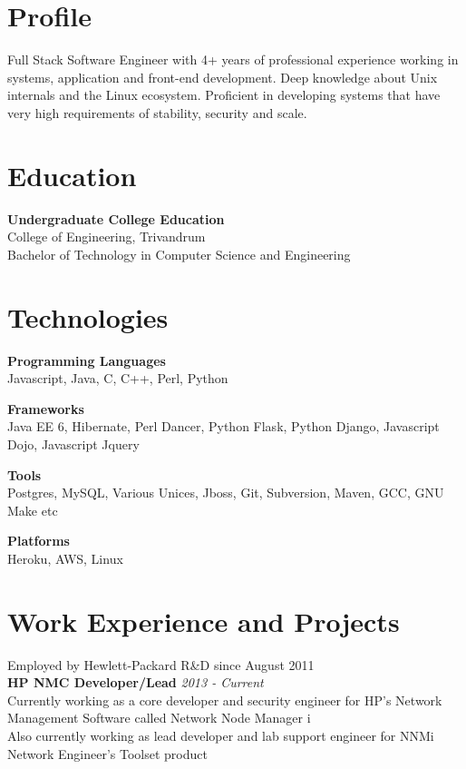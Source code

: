 \documentclass[line,margin]{res}
\begin{document}


\address{joji\_antony@gmx.com}
\address{+91 96323 41954}

\begin{resume}

\section{Profile}
Full Stack Software Engineer with 4+ years of professional experience working in systems, application and front-end development. Deep knowledge about Unix internals and the Linux ecosystem. Proficient in developing systems that have very high requirements of stability, security and scale.

\section{Education}
{\bf Undergraduate College Education}\\
College of Engineering, Trivandrum\\
Bachelor of Technology in Computer Science and Engineering\\

\section{Technologies}

{\bf Programming Languages}\\
Javascript, Java, C, C++, Perl, Python

{\bf Frameworks}\\
Java EE 6, Hibernate, Perl Dancer, Python Flask, Python Django, Javascript Dojo, Javascript Jquery

{\bf Tools}\\
Postgres, MySQL, Various Unices, Jboss, Git, Subversion, Maven, GCC, GNU Make etc

{\bf Platforms}\\
Heroku, AWS, Linux

\section{Work Experience and Projects}

Employed by Hewlett-Packard R\&D since August 2011\\

{\bf HP NMC Developer/Lead} \hfill {\it{2013 - Current}}\\
Currently working as a core developer and security engineer for HP's Network Management Software called Network Node Manager i\\
Also currently working as lead developer and lab support engineer for NNMi Network Engineer's Toolset product\\


\end{resume}
\end{document}
